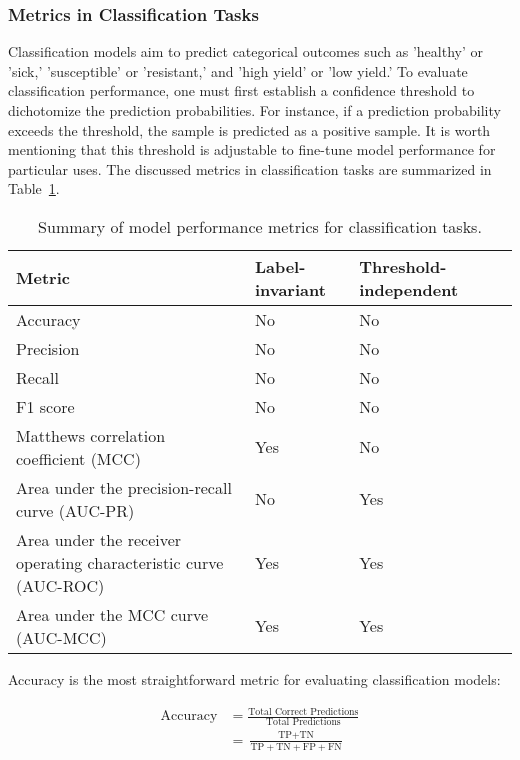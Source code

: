 \subsubsection{Metrics in Classification Tasks}

Classification models aim to predict categorical outcomes such as 'healthy' or 'sick,' 'susceptible' or 'resistant,' and 'high yield' or 'low yield.’ To evaluate classification performance, one must first establish a confidence threshold to dichotomize the prediction probabilities. For instance, if a prediction probability exceeds the threshold, the sample is predicted as a positive sample. It is worth mentioning that this threshold is adjustable to fine-tune model performance for particular uses. The discussed metrics in classification tasks are summarized in Table~\ref{tab:metrics-cls}.

\begin{table}[H]
    \caption{Summary of model performance metrics for classification tasks.}
    \centering
    \begin{tabular}{llll}
        \toprule
        Metric & Label-invariant & Threshold-independent \\
        \midrule
        Accuracy & No & No \\
        Precision & No & No \\
        Recall & No & No \\
        F1 score & No & No \\
        Matthews correlation coefficient (MCC) & Yes & No \\
        Area under the precision-recall curve (AUC-PR) & No & Yes \\
        Area under the receiver operating characteristic curve (AUC-ROC) & Yes & Yes \\
        Area under the MCC curve (AUC-MCC) & Yes & Yes \\
        \bottomrule
    \end{tabular}
    \label{tab:metrics-cls}
\end{table}

Accuracy is the most straightforward metric for evaluating classification models:

\begin{equation} \label{eq_accuracy}
    \begin{split}
\text{Accuracy} &= \frac{\text{Total Correct Predictions}}{\text{Total Predictions}} \\
        &= \frac{\text{TP} + \text{TN}}{\text{TP} + \text{TN} + \text{FP} + \text{FN}}
    \end{split}
\end{equation}

